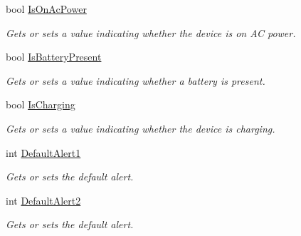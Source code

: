 \begin{DoxyCompactItemize}
\item 
bool \hyperlink{class_microsoft_1_1_tools_1_1_windows_device_portal_1_1_device_portal_1_1_battery_state_a5d670b15a530a9dc912e1c143a1e6bbb}{Is\+On\+Ac\+Power}
\begin{DoxyCompactList}\small\item\em Gets or sets a value indicating whether the device is on AC power. \end{DoxyCompactList}\item 
bool \hyperlink{class_microsoft_1_1_tools_1_1_windows_device_portal_1_1_device_portal_1_1_battery_state_a4370b58f84175aee38d87973aaa37363}{Is\+Battery\+Present}
\begin{DoxyCompactList}\small\item\em Gets or sets a value indicating whether a battery is present. \end{DoxyCompactList}\item 
bool \hyperlink{class_microsoft_1_1_tools_1_1_windows_device_portal_1_1_device_portal_1_1_battery_state_a11ec1ff82a6e6d7c56c020d05b4e25d3}{Is\+Charging}
\begin{DoxyCompactList}\small\item\em Gets or sets a value indicating whether the device is charging. \end{DoxyCompactList}\item 
int \hyperlink{class_microsoft_1_1_tools_1_1_windows_device_portal_1_1_device_portal_1_1_battery_state_adc269646db3f4e91db904fa1bf3ec49d}{Default\+Alert1}
\begin{DoxyCompactList}\small\item\em Gets or sets the default alert. \end{DoxyCompactList}\item 
int \hyperlink{class_microsoft_1_1_tools_1_1_windows_device_portal_1_1_device_portal_1_1_battery_state_a03e05ea8c25d935b1216b3746da024aa}{Default\+Alert2}
\begin{DoxyCompactList}\small\item\em Gets or sets the default alert. \end{DoxyCompactList}\item 

\end{DoxyCompactItemize}

